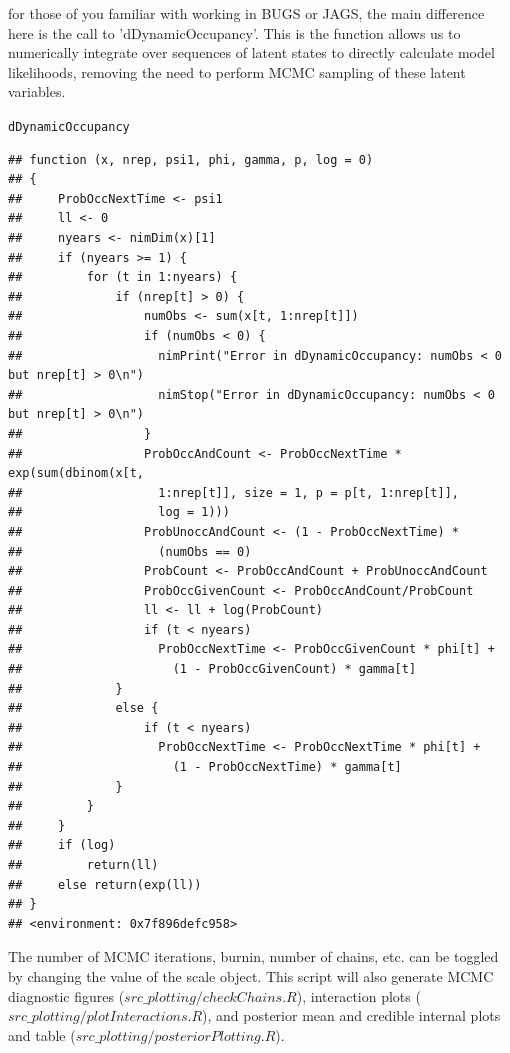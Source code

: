 \documentclass{article}\usepackage[]{graphicx}\usepackage[]{color}
\makeatletter
\newcommand{\hlstd}[1]{\textcolor[rgb]{0.345,0.345,0.345}{#1}}%
\newenvironment{kframe}{%
 \def\at@end@of@kframe{}%
 \ifinner\ifhmode%
  \def\at@end@of@kframe{\end{minipage}}%
  \begin{minipage}{\columnwidth}%
 \fi\fi%
 \def\FrameCommand##1{\hskip\@totalleftmargin \hskip-\fboxsep
 \colorbox{shadecolor}{##1}\hskip-\fboxsep
     \hskip-\linewidth \hskip-\@totalleftmargin \hskip\columnwidth}%
 \MakeFramed {\advance\hsize-\width
   \@totalleftmargin\z@ \linewidth\hsize
   \@setminipage}}%
 {\par\unskip\endMakeFramed%
 \at@end@of@kframe}
\newenvironment{knitrout}{}{} %
\makeatother
\begin{document}
for those of you familiar with working in BUGS or JAGS, the main
difference here is the call to 'dDynamicOccupancy'. This is the
function allows us to numerically integrate over sequences of latent
states to directly calculate model likelihoods, removing the need to
perform MCMC sampling of these latent variables.



\begin{knitrout}
\color{fgcolor}\begin{kframe}
\begin{alltt}
\hlstd{dDynamicOccupancy}
\end{alltt}
\begin{verbatim}
## function (x, nrep, psi1, phi, gamma, p, log = 0) 
## {
##     ProbOccNextTime <- psi1
##     ll <- 0
##     nyears <- nimDim(x)[1]
##     if (nyears >= 1) {
##         for (t in 1:nyears) {
##             if (nrep[t] > 0) {
##                 numObs <- sum(x[t, 1:nrep[t]])
##                 if (numObs < 0) {
##                   nimPrint("Error in dDynamicOccupancy: numObs < 0 but nrep[t] > 0\n")
##                   nimStop("Error in dDynamicOccupancy: numObs < 0 but nrep[t] > 0\n")
##                 }
##                 ProbOccAndCount <- ProbOccNextTime * exp(sum(dbinom(x[t, 
##                   1:nrep[t]], size = 1, p = p[t, 1:nrep[t]], 
##                   log = 1)))
##                 ProbUnoccAndCount <- (1 - ProbOccNextTime) * 
##                   (numObs == 0)
##                 ProbCount <- ProbOccAndCount + ProbUnoccAndCount
##                 ProbOccGivenCount <- ProbOccAndCount/ProbCount
##                 ll <- ll + log(ProbCount)
##                 if (t < nyears) 
##                   ProbOccNextTime <- ProbOccGivenCount * phi[t] + 
##                     (1 - ProbOccGivenCount) * gamma[t]
##             }
##             else {
##                 if (t < nyears) 
##                   ProbOccNextTime <- ProbOccNextTime * phi[t] + 
##                     (1 - ProbOccNextTime) * gamma[t]
##             }
##         }
##     }
##     if (log) 
##         return(ll)
##     else return(exp(ll))
## }
## <environment: 0x7f896defc958>
\end{verbatim}
\end{kframe}
\end{knitrout}

The number of MCMC iterations, burnin, number of chains, etc. can be
toggled by changing the value of the scale object. This script will
also generate MCMC diagnostic figures ($src\_plotting/checkChains.R$),
interaction plots ($src\_plotting/plotInteractions.R$), and posterior
mean and credible internal plots and table ($src\_plotting/posteriorPlotting.R$).
\end{document}
